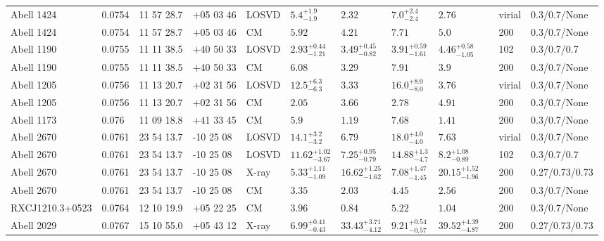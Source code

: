 \begin{landscape}
\begin{center}
{\begin{longtable}{llllllllllll}
Abell 1424 & 0.0754 & 11 57 28.7 & +05 03 46 & LOSVD & ${5.4}^{+1.9}_{-1.9}$ & ${2.32}^{}_{}$ & ${7.0}^{+2.4}_{-2.4}$ & ${2.76}^{}_{}$ & \citet{AB11.1} & virial & 0.3/0.7/None \\
Abell 1424 & 0.0754 & 11 57 28.7 & +05 03 46 & CM & ${5.92}^{}_{}$ & ${4.21}^{}_{}$ & ${7.71}^{}_{}$ & ${5.0}^{}_{}$ & \citet{RI06.1} & 200 & 0.3/0.7/None \\
Abell 1190 & 0.0755 & 11 11 38.5 & +40 50 33 & LOSVD & ${2.93}^{+0.44}_{-1.21}$ & ${3.49}^{+0.45}_{-0.82}$ & ${3.91}^{+0.59}_{-1.61}$ & ${4.46}^{+0.58}_{-1.05}$ & \citet{WO10.1} & 102 & 0.3/0.7/0.7 \\
Abell 1190 & 0.0755 & 11 11 38.5 & +40 50 33 & CM & ${6.08}^{}_{}$ & ${3.29}^{}_{}$ & ${7.91}^{}_{}$ & ${3.9}^{}_{}$ & \citet{RI06.1} & 200 & 0.3/0.7/None \\
Abell 1205 & 0.0756 & 11 13 20.7 & +02 31 56 & LOSVD & ${12.5}^{+6.3}_{-6.3}$ & ${3.33}^{}_{}$ & ${16.0}^{+8.0}_{-8.0}$ & ${3.76}^{}_{}$ & \citet{AB11.1} & virial & 0.3/0.7/None \\
Abell 1205 & 0.0756 & 11 13 20.7 & +02 31 56 & CM & ${2.05}^{}_{}$ & ${3.66}^{}_{}$ & ${2.78}^{}_{}$ & ${4.91}^{}_{}$ & \citet{RI06.1} & 200 & 0.3/0.7/None \\
Abell 1173 & 0.076 & 11 09 18.8 & +41 33 45 & CM & ${5.9}^{}_{}$ & ${1.19}^{}_{}$ & ${7.68}^{}_{}$ & ${1.41}^{}_{}$ & \citet{RI06.1} & 200 & 0.3/0.7/None \\
Abell 2670 & 0.0761 & 23 54 13.7 & -10 25 08 & LOSVD & ${14.1}^{+3.2}_{-3.2}$ & ${6.79}^{}_{}$ & ${18.0}^{+4.0}_{-4.0}$ & ${7.63}^{}_{}$ & \citet{AB11.1} & virial & 0.3/0.7/None \\
Abell 2670 & 0.0761 & 23 54 13.7 & -10 25 08 & LOSVD & ${11.62}^{+1.02}_{-3.67}$ & ${7.25}^{+0.95}_{-0.79}$ & ${14.88}^{+1.3}_{-4.7}$ & ${8.2}^{+1.08}_{-0.89}$ & \citet{WO10.1} & 102 & 0.3/0.7/0.7 \\
Abell 2670 & 0.0761 & 23 54 13.7 & -10 25 08 & X-ray & ${5.33}^{+1.11}_{-1.09}$ & ${16.62}^{+1.25}_{-1.62}$ & ${7.08}^{+1.47}_{-1.45}$ & ${20.15}^{+1.52}_{-1.96}$ & \citet{BA14.1} & 200 & 0.27/0.73/0.73 \\
Abell 2670 & 0.0761 & 23 54 13.7 & -10 25 08 & CM & ${3.35}^{}_{}$ & ${2.03}^{}_{}$ & ${4.45}^{}_{}$ & ${2.56}^{}_{}$ & \citet{RI06.1} & 200 & 0.3/0.7/None \\
RXCJ1210.3+0523 & 0.0764 & 12 10 19.9 & +05 22 25 & CM & ${3.96}^{}_{}$ & ${0.84}^{}_{}$ & ${5.22}^{}_{}$ & ${1.04}^{}_{}$ & \citet{RI06.1} & 200 & 0.3/0.7/None \\
Abell 2029 & 0.0767 & 15 10 55.0 & +05 43 12 & X-ray & ${6.99}^{+0.41}_{-0.43}$ & ${33.43}^{+3.71}_{-4.12}$ & ${9.21}^{+0.54}_{-0.57}$ & ${39.52}^{+4.39}_{-4.87}$ & \citet{BA14.1} & 200 & 0.27/0.73/0.73 \\

\end{longtable}}
\end{center}
\end{landscape}
